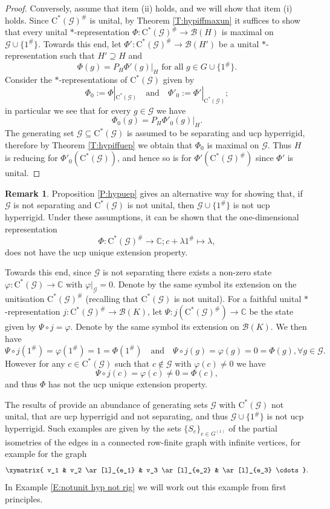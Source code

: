 \documentclass[11pt, draft]{amsart}
\numberwithin{equation}{section}
\theoremstyle{plain}
\theoremstyle{definition}
\newtheorem{remark}[theorem]{Remark}
\theoremstyle{remark}
\newcommand{\B}{{\mathcal{B}}}
\newcommand{\G}{{\mathcal{G}}}
\def\la{\lambda}
\newcommand\vphi{\varphi}
\newcommand{\bC}{\mathbb{C}}
\newcommand{\foral}{\text{ for all }}
\newcommand{\qand}{\quad\text{and}\quad}
\newcommand{\ca}{\mathrm{C}^*}
\begin{document}
\begin{proof}
Conversely, assume that item (ii) holds, and we will show that item (i) holds.
Since $\ca(\G)^{\#}$ is unital, by Theorem \ref{T:hypiffmaxun} it suffices to show that every unital $*$-representation $\Phi\colon \ca(\G)^{\#} \to \B(H)$ is maximal on $\G\cup\{1^\#\}$.
Towards this end, let $\Phi' \colon \ca(\G)^{\#} \to \B(H')$ be a unital $*$-representation such that $H'\supseteq H$ and 
\[
\Phi(g)=P_H\Phi'(g)|_H \foral g\in G\cup\{1^\#\}.
\]
Consider the $*$-representations of $\ca(\G)$ given by
\[
\Phi_0:= \Phi|_{\ca(\G)}
\qand
\Phi'_0 := \Phi'|_{\ca(\G)};
\]
in particular we see that for every $g \in \G$ we have
\[
\Phi_0(g)
=
P_H \Phi'_0(g)|_H.
\]
The generating set $\G\subseteq \ca(\G)$ is assumed to be separating and ucp hyperrigid, therefore by Theorem \ref{T:hypiffuep} we obtain that $\Phi_0$ is maximal on $\G$. 
Thus $H$ is reducing for $\Phi'_0(\ca(\G))$, and hence so is for $\Phi'(\ca(\G)^\#)$ since $\Phi'$ is unital.
\end{proof}

\begin{remark} \label{R:unit ccp/ucp}
Proposition \ref{P:hypuep} gives an alternative way for showing that, if $\G$ is not separating and $\ca(\G)$ is not unital, then $\G \cup \{1^{\#}\}$ is not ucp hyperrigid.
Under these assumptions, it can be shown that the one-dimensional representation 
\[
\Phi \colon \ca(\G)^{\#} \to \bC; c + \la 1^{\#} \mapsto \la,
\]
does not have the ucp unique extension property.

Towards this end, since $\G$ is not separating there exists a non-zero state $\vphi \colon \ca(\G) \to \bC$ with $\vphi|_{\G} = 0$.
Denote by the same symbol its extension on the unitisation $\ca(\G)^{\#}$ (recalling that $\ca(\G)$ is not unital).
For a faithful unital $*$-representation $j \colon \ca(\G)^{\#} \to \B(K)$, let $\Psi \colon j(\ca(\G)^{\#}) \to \bC$ be the state given by $\Psi \circ j = \vphi$.
Denote by the same symbol its extension on $\B(K)$.
We then have
\[
\Psi \circ j(1^{\#}) = \vphi(1^{\#}) = 1 = \Phi(1^{\#})
\qand
\Psi \circ j(g) = \vphi(g) = 0 = \Phi(g),
\forall g \in \G.
\]
However for any $c\in\ca(\G)$ such that $c \notin \G$ with $\vphi(c) \neq 0$ we have
\[
\Psi \circ j(c) = \vphi(c) \neq 0 = \Phi(c),
\]
and thus $\Phi$ has not the ucp unique extension property.

The results of \cite[Section 4 and Section 5]{Sal17} provide an abundance of generating sets $\G$ with $\ca(\G)$ not unital, that are ucp hyperrigid and not separating, and thus $\G \cup \{1^{\#}\}$ is not ucp hyperrigid.
Such examples are given by the sets $\{S_e\}_{e \in G^{(1)}}$ of the partial isometries of the edges in a connected row-finite graph with infinite vertices, for example for the graph
\[
\xymatrix{ v_1 & v_2 \ar[l]_{e_1} & v_3 \ar[l]_{e_2} & \ar[l]_{e_3} \cdots} .
\]
In Example \ref{E:notunit hyp not rig} we will work out this example from first principles.
\end{remark}
\end{document}
